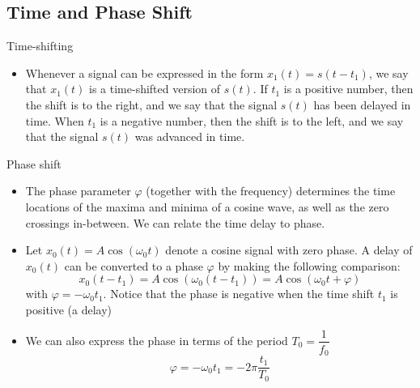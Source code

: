\subsection{Time and Phase Shift}
Time-shifting
\begin{itemize}
	\item Whenever a signal can be expressed in the form $x_1 (t) = s(t - t_1)$, we say that $x_1 (t)$ is a time-shifted version of $s(t)$. If $t_1$ is a positive number, then the shift is to the right, and we say that the signal $s(t)$ has been delayed in time. When $t_1$ is a negative number, then the shift is to the left, and we say that the signal $s(t)$ was advanced in time.
\end{itemize}
Phase shift
\begin{itemize}
	\item The phase parameter $\varphi$ (together with the frequency) determines the time locations of the maxima and minima of a cosine wave, as well as the zero crossings in-between. We can relate the time delay to phase.
	\item Let $x_0 (t) = A \cos(\omega_0 t)$ denote a cosine signal with zero phase. A delay of $x_0 (t)$ can be converted to a phase $\varphi$ by making the following comparison:
	\begin{equation}
		x_0 (t - t_1 ) = A \cos(\omega_0 (t - t_1 )) = A \cos(\omega_0 t + \varphi)
	\end{equation}
	with $\varphi=-\omega_0 t_1$. Notice that the phase is negative when the time shift $t_1$ is positive (a delay)
	\item We can also express the phase in terms of the period $T_0 = \dfrac{1}{f_0}$
	\begin{equation}
		\varphi=-\omega_0 t_1 = -2\pi \dfrac{t_1}{T_0}
	\end{equation}
\end{itemize}




